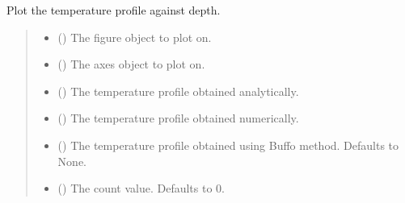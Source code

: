 \documentclass[a4paper,11pt,english,openany]{sphinxmanual}
\begin{document}
\begin{fulllineitems}
\begin{fulllineitems}
\label{\detokenize{api/spyice.models.sea_ice_model:src.spyice.models.sea_ice_model.SeaIceModel.t_running}}
\pysigstartsignatures
\pysiglinewithargsret
{}
{\sphinxparamcomma {}\sphinxparamcomma {}\sphinxparamcomma {}\sphinxparamcomma {}\sphinxparamcomma {}}
{}
\pysigstopsignatures
\sphinxAtStartPar
Plot the temperature profile against depth.
\begin{quote}\begin{description}
\begin{itemize}
\item {} 
\sphinxAtStartPar
{} () \textendash{} The figure object to plot on.

\item {} 
\sphinxAtStartPar
{} () \textendash{} The axes object to plot on.

\item {} 
\sphinxAtStartPar
{} () \textendash{} The temperature profile obtained analytically.

\item {} 
\sphinxAtStartPar
{} () \textendash{} The temperature profile obtained numerically.

\item {} 
\sphinxAtStartPar
{} (\sphinxstyleliteralemphasis{\sphinxupquote{, }}) \textendash{} The temperature profile obtained using Buffo method. Defaults to None.

\item {} 
\sphinxAtStartPar
{} (\sphinxstyleliteralemphasis{\sphinxupquote{, }}) \textendash{} The count value. Defaults to 0.


\end{itemize}
\end{description}
\end{quote}
\end{fulllineitems}
\end{fulllineitems}
\end{document}
